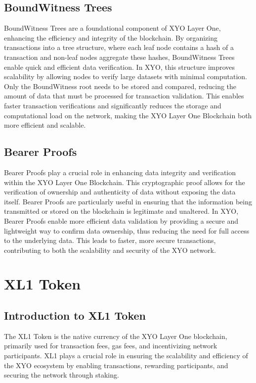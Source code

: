 \documentclass{article}
\begin{document}
\subsection{BoundWitness Trees}
BoundWitness Trees are a foundational component of XYO Layer One, enhancing the
efficiency and integrity of the blockchain. By organizing transactions into a
tree structure, where each leaf node contains a hash of a transaction and
non-leaf nodes aggregate these hashes, BoundWitness Trees enable quick and
efficient data verification. In XYO, this structure improves scalability by
allowing nodes to verify large datasets with minimal computation. Only the
BoundWitness root needs to be stored and compared, reducing the amount of data
that must be processed for transaction validation. This enables faster
transaction verifications and significantly reduces the storage and
computational load on the network, making the XYO Layer One Blockchain both
more efficient and scalable.

\subsection{Bearer Proofs}
Bearer Proofs play a crucial role in enhancing data integrity and verification
within the XYO Layer One Blockchain. This cryptographic proof allows for the
verification of ownership and authenticity of data without exposing the data
itself. Bearer Proofs are particularly useful in ensuring that the information
being transmitted or stored on the blockchain is legitimate and unaltered. In
XYO, Bearer Proofs enable more efficient data validation by providing a secure
and lightweight way to confirm data ownership, thus reducing the need for full
access to the underlying data. This leads to faster, more secure transactions,
contributing to both the scalability and security of the XYO network.

\section{XL1 Token}

\subsection{Introduction to XL1 Token}
The XL1 Token is the native currency of the XYO Layer One blockchain,
primarily used for transaction fees, gas fees, and incentivizing network
participants. XL1 plays a crucial role in ensuring the scalability and
efficiency of the XYO ecosystem by enabling transactions, rewarding
participants, and securing the network through staking.
\end{document}
